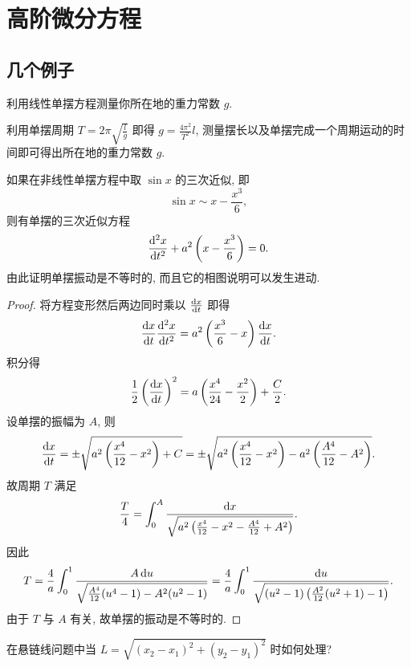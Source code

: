 \setcounter{chapter}{4}
\chapter{高阶微分方程}



\section{几个例子}



\begin{exercise}
  利用线性单摆方程测量你所在地的重力常数 $g$.
\end{exercise}

\begin{solution} 
  利用单摆周期 $T=2\pi\sqrt{\frac{l}{g}}$ 即得 $g=\frac{4\pi^2}{T^2}l$, 
  测量摆长以及单摆完成一个周期运动的时间即可得出所在地的重力常数 $g$.
\end{solution}



\begin{exercise}
  如果在非线性单摆方程中取 $\sin x$ 的三次近似, 即
  \[\sin x\sim x-\frac{x^3}{6},\]
  则有单摆的三次近似方程
  \[\frac{\mathop{}\!\mathrm{d}^2x}{\mathop{}\!\mathrm{d} t^2}+a^2\left(x-\frac{x^3}{6}\right)=0.\]
  由此证明单摆振动是不等时的, 而且它的相图说明可以发生进动.
\end{exercise}

\begin{proof}
  将方程变形然后两边同时乘以 $\frac{\mathop{}\!\mathrm{d} x}{\mathop{}\!\mathrm{d} t}$ 即得
  \[\frac{\mathop{}\!\mathrm{d} x}{\mathop{}\!\mathrm{d} t}\frac{\mathop{}\!\mathrm{d}^2x}{\mathop{}\!\mathrm{d} t^2}
    = a^2\left(\frac{x^3}{6}-x\right)\frac{\mathop{}\!\mathrm{d} x}{\mathop{}\!\mathrm{d} t}.\]
  积分得
  \[\frac{1}{2}\left(\frac{\mathop{}\!\mathrm{d} x}{\mathop{}\!\mathrm{d} t}\right)^2
    = a\left(\frac{x^4}{24}-\frac{x^2}{2}\right)+\frac{C}{2}.\]
  设单摆的振幅为 $A$, 则
  \[\frac{\mathop{}\!\mathrm{d} x}{\mathop{}\!\mathrm{d} t}=\pm\sqrt{a^2\left(\frac{x^4}{12}-x^2\right)+C}
    = \pm\sqrt{a^2\left(\frac{x^4}{12}-x^2\right)-a^2\left(\frac{A^4}{12}-A^2\right)}.\]
  故周期 $T$ 满足
  \[\frac{T}{4}=\int_0^A\frac{\mathop{}\!\mathrm{d} x}{\sqrt{a^2\left(\frac{x^4}{12}-x^2-\frac{A^4}{12}+A^2\right)}}.\]
  因此
  \[T=\frac{4}{a}\int_0^1\frac{A\mathop{}\!\mathrm{d} u}{\sqrt{\frac{A^4}{12}(u^4-1)-A^2(u^2-1)}}
    = \frac{4}{a}\int_0^1\frac{\mathop{}\!\mathrm{d} u}{\sqrt{(u^2-1)\left(\frac{A^2}{12}(u^2+1)-1\right)}}.\]
  由于 $T$ 与 $A$ 有关, 故单摆的振动是不等时的.
\end{proof}



\begin{exercise}
  在悬链线问题中当 $L=\sqrt{(x_2-x_1)^2+(y_2-y_1)^2}$ 时如何处理?
\end{exercise}

